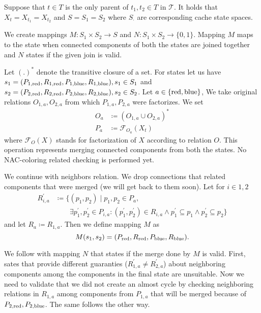Suppose that \( t \in T \) is
the only parent of \( t_1, t_2 \in T \) in \( \mathcal {T} \).
It holds that \( X_t = X_{t_1} = X_{t_2} \)
and \( S = S_1 = S_2 \) where \( S_\cdot \) are corresponding cache state spaces.

We create mappings \( M: S_1 \times S_2 \to S \) and \( N: S_1 \times S_2 \to \{0, 1\} \).
Mapping \( M \) maps to the state when connected components of both the states
are joined together and \( N \) states if the given join is valid.

Let \( {(.)}^* \) denote the transitive closure of a set.
For states let us have
\( s_1 = (P_{1,\text{red}}, R_{1,\text{red}}, P_{1,\text{blue}}, R_{1,\text{blue}}), s_1 \in S_1 \) and
\( s_2 = (P_{2,\text{red}}, R_{2,\text{red}}, P_{2,\text{blue}}, R_{2,\text{blue}}), s_2 \in S_2 \).
Let \( a \in \{\text{red}, \text{blue}\} \),
We take original relations \( O_{1, a}, O_{2, a} \)
from which \( P_{1, a}, P_{2, a} \) were factorizes.
We set
%
\begin{align*}
	O_a & \coloneqq {(O_{1, a} \cup O_{2, a})}^* \\
	P_a & \coloneqq \mathcal{F}_{O_a}(X_t)
\end{align*}
%
where \( \mathcal{F}_O(X) \) stands for factorization of \( X \)
according to relation \( O \). This operation represents merging connected
components from both the states. No NAC-coloring related checking is performed yet.

We continue with neighbors relation. We drop connections that related components
that were merged (we will get back to them soon).
Let for \( i \in {1, 2} \)
%
\begin{align*}
	R_{i,a}^\prime & \coloneqq \{(p_1, p_2) \mid p_1, p_2 \in P_a,                                                                                                            \\
	               & \qquad \exists p_1^\prime, p_2^\prime \in P_{i,a} : (p_1^\prime, p_2^\prime) \in R_{i,a} \land p_1^\prime \subseteq p_1 \land p_2^\prime \subseteq p_2\}
\end{align*}
%
and \WLOG{} let \( R_a \coloneqq R_{1,a} \).
Then we define mapping \( M \) as \[ M(s_1, s_2) = (P_{\text{red}}, R_{\text{red}}, P_{\text{blue}}, R_{\text{blue}}). \]

We follow with mapping \( N \) that states if the merge done by \( M \) is valid.
First, sates that provide different guaranties
(\( R_{1,a}^\prime \not= R_{2,a}^\prime \)) about neighboring components
among the components in the final state are unsuitable.
Now we need to validate that we did not create an almost cycle by checking
neighboring relations in \( R_{1,a} \) among components from \( P_{1,a} \)
that will be merged because of \( P_{2,\text{red}}, P_{2,\text{blue}} \).
The same follows the other way.

